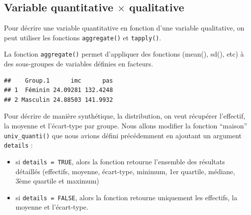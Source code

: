 \documentclass[
]{book}
\newenvironment{Shaded}{\begin{snugshade}}{\end{snugshade}}
\newcommand{\AttributeTok}[1]{\textcolor[rgb]{0.13,0.29,0.53}{#1}}
\newcommand{\CommentTok}[1]{\textcolor[rgb]{0.56,0.35,0.01}{\textit{#1}}}
\newcommand{\DocumentationTok}[1]{\textcolor[rgb]{0.56,0.35,0.01}{\textbf{\textit{#1}}}}
\newcommand{\FunctionTok}[1]{\textcolor[rgb]{0.13,0.29,0.53}{\textbf{#1}}}
\newcommand{\NormalTok}[1]{#1}
\newcommand{\SpecialCharTok}[1]{\textcolor[rgb]{0.81,0.36,0.00}{\textbf{#1}}}
\newcommand{\StringTok}[1]{\textcolor[rgb]{0.31,0.60,0.02}{#1}}
\providecommand{\tightlist}{%
  \setlength{\itemsep}{0pt}\setlength{\parskip}{0pt}}
\begin{document}
\subsection{\texorpdfstring{Variable quantitative \(\times\) qualitative}{Variable quantitative \textbackslash times qualitative}}\label{variable-quantitative-times-qualitative}

Pour décrire une variable quantitative en fonction d'une variable qualitative, on peut utiliser les fonctions \texttt{aggregate()} et \texttt{tapply()}.

La fonction \texttt{aggregate()} permet d'appliquer des fonctions (mean(), sd(), etc) à des sous-groupes de variables définies en facteurs.

\begin{Shaded}
\end{Shaded}

\begin{verbatim}
##    Group.1      imc      pas
## 1  Féminin 24.09281 132.4248
## 2 Masculin 24.88503 141.9932
\end{verbatim}

Pour décrire de manière synthétique, la distribution, on veut récupérer l'effectif, la moyenne et l'écart-type par groupe. Nous allons modifier la fonction ``maison'' \texttt{univ\_quanti()} que nous avions défini précédemment en ajoutant un argument \texttt{details} :

\begin{itemize}
\tightlist
\item
  si \texttt{details\ =\ TRUE}, alors la fonction retourne l'ensemble des résultats détaillés (effectifs, moyenne, écart-type, minimum, 1er quartile, médiane, 3ème quartile et maximum)
\item
  si \texttt{details\ =\ FALSE}, alors la fonction retourne uniquement les effectifs, la moyenne et l'écart-type.
\end{itemize}
\end{document}
